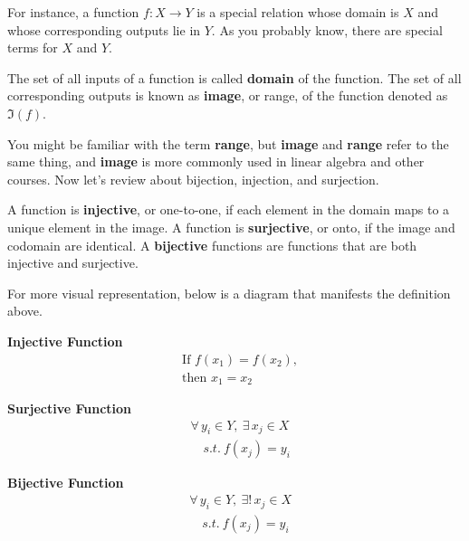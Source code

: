 \documentclass[../main.tex]{subfiles}
\begin{document}
For instance, a function $f: X \to Y$ is a special relation whose
domain is $X$ and whose corresponding outputs lie in $Y$. As you
probably know, there are special terms for $X$ and $Y$.

\begin{definition}
The set of all inputs of a function is called \textbf{domain} of the
function. The set of all corresponding outputs is known as
\textbf{image}, or range, of the function denoted as $\Im(f)$.
\end{definition}

You might be familiar with the term \textbf{range}, but \textbf{image}
and \textbf{range} refer to the same thing, and \textbf{image} is
more commonly used in linear algebra and other courses. Now let's
review about bijection, injection, and surjection.

\begin{definition}
A function is \textbf{injective}, or one-to-one, if each element in
the domain maps to a unique element in the image. A function is
\textbf{surjective}, or onto, if the image and codomain are identical.
A \textbf{bijective} functions are functions that are both injective
and surjective.
\end{definition}

For more visual representation, below is a diagram that manifests
the definition above.

\begin{minipage}{0.32\textwidth}
\begin{center}
\textbf{Injective Function}
\begin{align*}
    &\text{If } f(x_1) = f(x_2), \\
    &\text{then } x_1 = x_2
\end{align*}
\end{center}
\end{minipage}
\begin{minipage}{0.32\textwidth}
\begin{center}
\textbf{Surjective Function}
\begin{align*}
    &\forall\, y_i \in Y,\ \exists\, x_j \in X \\
    &\quad s.t.\ f(x_j) = y_i
\end{align*}
\end{center}
\end{minipage}
\begin{minipage}{0.32\textwidth}
\begin{center}
\textbf{Bijective Function}
\begin{align*}
    &\forall\, y_i \in Y,\ \exists!\, x_j \in X \\
    &\quad s.t.\ f(x_j) = y_i
\end{align*}
\end{center}
\end{minipage}
\end{document}
